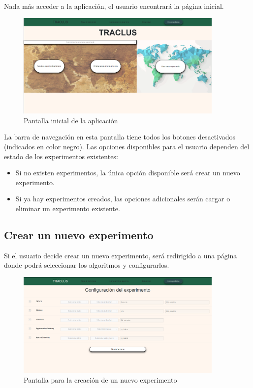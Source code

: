 Nada más acceder a la aplicación, el usuario encontrará la página inicial. 

\begin{figure}[H]
    \centering
    \includegraphics[width=0.9\textwidth]{img/webpage/main_page.png}
    \caption{Pantalla inicial de la aplicación}
\end{figure}

La barra de navegación en esta pantalla tiene todos los botones desactivados (indicados en color negro). Las opciones disponibles para el usuario dependen del estado de los experimentos existentes:

\begin{itemize}
    \item Si no existen experimentos, la única opción disponible será crear un nuevo experimento.
    \item Si ya hay experimentos creados, las opciones adicionales serán cargar o eliminar un experimento existente.
\end{itemize}

\subsection{Crear un nuevo experimento}

Si el usuario decide crear un nuevo experimento, será redirigido a una página donde podrá seleccionar los algoritmos y configurarlos. 

\begin{figure}[H]
    \centering
    \includegraphics[width=0.9\textwidth]{img/webpage/experiment_page.png}
    \caption{Pantalla para la creación de un nuevo experimento}
\end{figure}

